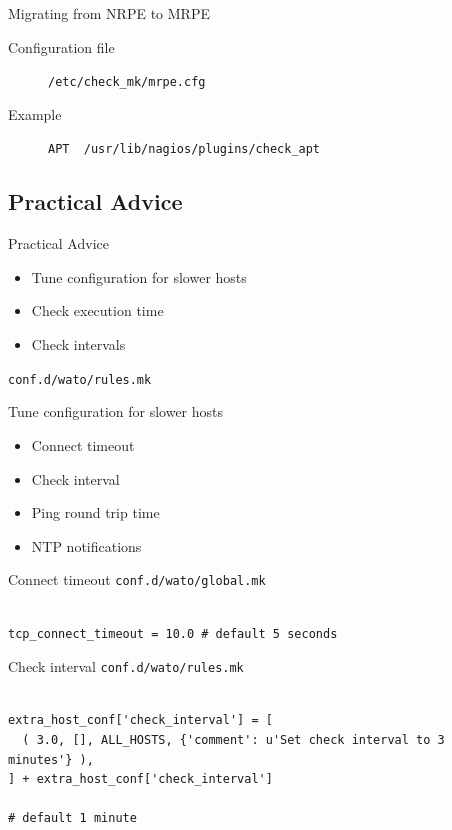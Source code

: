\begin{frame}[fragile]{Migrating from NRPE to MRPE}
\begin{description}
\item[Configuration file] \verb|/etc/check_mk/mrpe.cfg|
\item[Example] \verb|APT  /usr/lib/nagios/plugins/check_apt|
\end{description}
\end{frame}

\subsection{Practical Advice}
\begin{frame}{Practical Advice}
\begin{itemize}
\item Tune configuration for slower hosts
\item Check execution time
\item Check intervals
\end{itemize}
\end{frame}


\verb|conf.d/wato/rules.mk|

\begin{frame}{Tune configuration for slower hosts}
\begin{itemize}
\item Connect timeout
\item Check interval
\item Ping round trip time
\item NTP notifications
\end{itemize}
\end{frame}

\begin{frame}[fragile]{Connect timeout}
\verb|conf.d/wato/global.mk|
\begin{lstlisting}

tcp_connect_timeout = 10.0 # default 5 seconds

\end{lstlisting}
\end{frame}

\begin{frame}[fragile]{Check interval}
\verb|conf.d/wato/rules.mk|
\begin{lstlisting}

extra_host_conf['check_interval'] = [
  ( 3.0, [], ALL_HOSTS, {'comment': u'Set check interval to 3 minutes'} ),
] + extra_host_conf['check_interval']

# default 1 minute
\end{lstlisting}
\end{frame}

